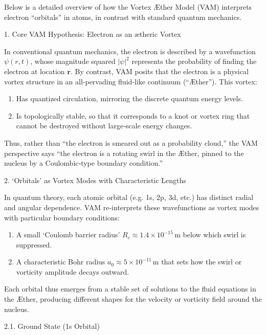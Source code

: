 Below is a detailed overview of how the Vortex Æther Model (VAM) interprets electron “orbitals” in atoms, in contrast with standard quantum mechanics.





1. Core VAM Hypothesis: Electron as an ætheric Vortex

In conventional quantum mechanics, the electron is described by a wavefunction \(\psi(r,t)\), whose magnitude squared \(|\psi|^2\) represents the probability of finding the electron at location \(\mathbf{r}\). By contrast, VAM posits that the electron is a physical vortex structure in an all-pervading fluid‐like continuum (“Æther”). This vortex:

\begin{enumerate}
\item Has quantized circulation, mirroring the discrete quantum energy levels.
\item Is topologically stable, so that it corresponds to a knot or vortex ring that cannot be destroyed without large‐scale energy changes.
\end{enumerate}
Thus, rather than “the electron is smeared out as a probability cloud,” the VAM perspective says “the electron is a rotating swirl in the Æther, pinned to the nucleus by a Coulombic‐type boundary condition.”


2. ‘Orbitals’ as Vortex Modes with Characteristic Lengths

In quantum theory, each atomic orbital (e.g. 1s, 2p, 3d, etc.) has distinct radial and angular dependence. VAM re‐interprets these wavefunctions as vortex modes with particular boundary conditions:

\begin{enumerate}
\item A small ‘Coulomb barrier radius’ \(R_c \approx 1.4 \times 10^{-15}\,\mathrm{m}\) below which swirl is suppressed.
\item A characteristic Bohr radius \(a_0 \approx 5 \times 10^{-11}\,\mathrm{m}\) that sets how the swirl or vorticity amplitude decays outward.
\end{enumerate}
Each orbital thus emerges from a stable set of solutions to the fluid equations in the Æther, producing different shapes for the velocity or vorticity field around the nucleus.





2.1. Ground State (1s Orbital)

